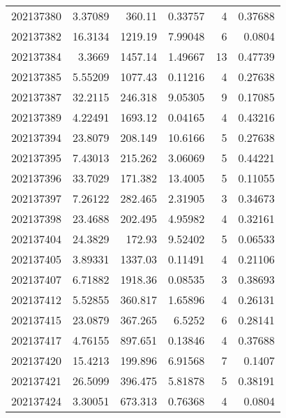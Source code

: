 \begin{tabular}{rrrrrr}
 202137380 &          3.37089 &      360.11   &            0.33757 &           4 & 0.37688 \\
 202137382 &         16.3134  &     1219.19   &            7.99048 &           6 & 0.0804  \\
 202137384 &          3.3669  &     1457.14   &            1.49667 &          13 & 0.47739 \\
 202137385 &          5.55209 &     1077.43   &            0.11216 &           4 & 0.27638 \\
 202137387 &         32.2115  &      246.318  &            9.05305 &           9 & 0.17085 \\
 202137389 &          4.22491 &     1693.12   &            0.04165 &           4 & 0.43216 \\
 202137394 &         23.8079  &      208.149  &           10.6166  &           5 & 0.27638 \\
 202137395 &          7.43013 &      215.262  &            3.06069 &           5 & 0.44221 \\
 202137396 &         33.7029  &      171.382  &           13.4005  &           5 & 0.11055 \\
 202137397 &          7.26122 &      282.465  &            2.31905 &           3 & 0.34673 \\
 202137398 &         23.4688  &      202.495  &            4.95982 &           4 & 0.32161 \\
 202137404 &         24.3829  &      172.93   &            9.52402 &           5 & 0.06533 \\
 202137405 &          3.89331 &     1337.03   &            0.11491 &           4 & 0.21106 \\
 202137407 &          6.71882 &     1918.36   &            0.08535 &           3 & 0.38693 \\
 202137412 &          5.52855 &      360.817  &            1.65896 &           4 & 0.26131 \\
 202137415 &         23.0879  &      367.265  &            6.5252  &           6 & 0.28141 \\
 202137417 &          4.76155 &      897.651  &            0.13846 &           4 & 0.37688 \\
 202137420 &         15.4213  &      199.896  &            6.91568 &           7 & 0.1407  \\
 202137421 &         26.5099  &      396.475  &            5.81878 &           5 & 0.38191 \\
 202137424 &          3.30051 &      673.313  &            0.76368 &           4 & 0.0804  \\

\end{tabular}
